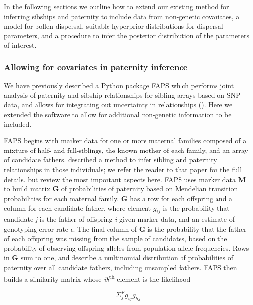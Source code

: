 \documentclass[10pt, a4paper, twocolumn]{article} %
\begin{document}
In the following sections we outline how to extend our existing method for inferring sibships and paternity to include data from non-genetic covariates, a model for pollen dispersal, suitable hyperprior distributions for dispersal parameters, and a procedure to infer the posterior distribution of the parameters of interest.

\subsubsection{Allowing for covariates in paternity inference}

We have previously described a Python package FAPS which performs joint analysis of paternity and sibship relationships for sibling arrays based on SNP data, and allows for integrating out uncertainty in relationships (\cite{ellis2018efficient}). Here we extended the software to allow for additional non-genetic information to be included.

FAPS begins with marker data for one or more maternal families composed of a mixture of half- and full-siblings, the known mother of each family, and an array of candidate fathers.
\textcite{ellis2018efficient} described a method to infer sibling and paternity relationships in those individuals; we refer the reader to that paper for the full details, but review the most important aspects here.
FAPS uses marker data \textbf{M} to build matrix \textbf{G} of probabilities of paternity based on Mendelian transition probabilities for each maternal family.
\textbf{G} has a row for each offspring and a column for each candidate father, where element $g_{ij}$ is the probability that candidate \textit{j} is the father of offspring \textit{i} given marker data, and an estimate of genotyping error rate $\epsilon$. 
The final column of \textbf{G} is the probability that the father of each offspring was missing from the sample of candidates, based on the probability of observing offspring alleles from population allele frequencies.
Rows in \textbf{G} sum to one, and describe a multinomial distribution of probabilities of paternity over all candidate fathers, including unsampled fathers.
FAPS then builds a similarity matrix whose \textit{ih}\textsuperscript{th} element is the likelihood

\begin{equation}\label{eqn:faps_similarity_matrix}
    \Sigma_j^F g_{ij}g_{hj}
\end{equation}
\end{document}
